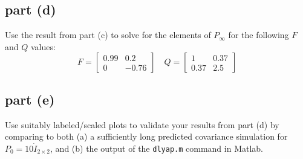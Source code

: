 \documentclass[11pt]{article}
\begin{document}
\subsection*{part (d)}
Use the result from part (c) to solve for the elements of $P_\infty$ for the following $F$ and $Q$ values:
\begin{equation*}
	F=\begin{bmatrix} 0.99&0.2\\0&-0.76 \end{bmatrix}\quad Q=\begin{bmatrix} 1&0.37\\0.37&2.5 \end{bmatrix}
\end{equation*}

\subsection*{part (e)}
Use suitably labeled/scaled plots to validate your results from part (d) by comparing to both (a) a sufficiently long predicted covariance simulation for $P_0=10\dot I_{2\times 2}$, and (b) the output of the \texttt{dlyap.m} command in Matlab.
\end{document}

